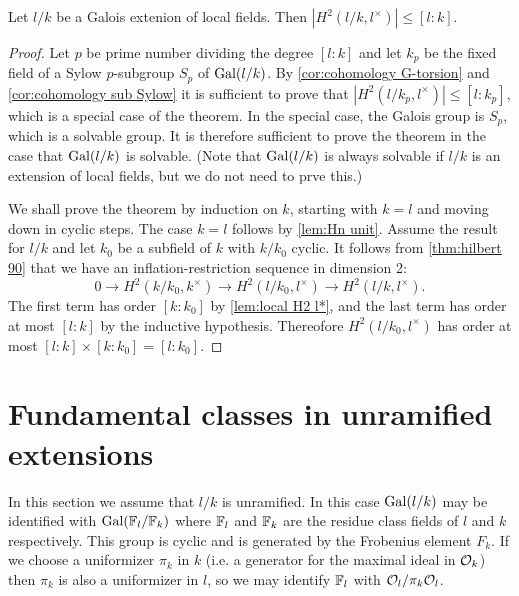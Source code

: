 \begin{theorem} \label{lem:local H2 upper bound}
	Let $l/k$ be a Galois extenion of local fields.
	Then $|H^2(l/k,l^\times)| \le [l:k]$.
\end{theorem}

\begin{proof}
	Let $p$ be prime number dividing the degree $[l:k]$ and let $k_p$ be the fixed field
	of a Sylow $p$-subgroup $S_p$ of $\mathrm{Gal}(l/k)$.
	By \ref{cor:cohomology G-torsion} and \ref{cor:cohomology sub Sylow}
	it is sufficient to prove that $|H^2(l/k_p,l^\times)| \le [l:k_p]$,
	which is a special case of the theorem.
	In the special case, the Galois group is $S_p$, which is a solvable group.
	It is therefore sufficient to prove the theorem in the case that $\mathrm{Gal}(l/k)$ is solvable.
	(Note that $\mathrm{Gal}(l/k)$ is always solvable if $l/k$ is an extension of local fields,
	but we do not need to prve this.)

	We shall prove the theorem by induction on $k$, starting with $k=l$ and moving down in
	cyclic steps.
	The case $k=l$ follows by \ref{lem:Hn unit}.
	Assume the result for $l/k$ and let $k_0$ be a subfield of $k$ with $k/k_0$ cyclic.
	It follows from \ref{thm:hilbert 90} that
	we have an inflation-restriction sequence in dimension 2:
	\[
		0 \to H^2(k/k_0, k^\times) \to H^2( l/k_0, l^\times) \to H^2(l/k, l^\times).
	\]
	The first term has order $[k : k_0]$ by \ref{lem:local H2 l*}, and the last term has
	order at most $[l:k]$ by the inductive hypothesis.
	Thereofore $H^2( l/k_0, l^\times)$ has order at most $[l:k] \times [k : k_0] = [l: k_0]$.
\end{proof}







\section{Fundamental classes in unramified extensions}

In this section we assume that $l/k$ is unramified.
In this case $\mathrm{Gal}(l/k)$ may be identified with $\mathrm{Gal}({\mathbb F}_l / {\mathbb F}_k)$ where
${\mathbb F}_l$ and ${\mathbb F}_k$ are the residue class fields of $l$ and $k$ respectively.
This group is cyclic and is generated by the Frobenius element $F_k$.
If we choose a uniformizer $\pi_k$ in $k$ (i.e. a generator for the maximal ideal in ${\mathcal O}_k$)
then $\pi_k$ is also a uniformizer in $l$, so we may identify ${\mathbb F}_l$ with ${\mathcal O}_l / \pi_k {\mathcal O}_l$.

